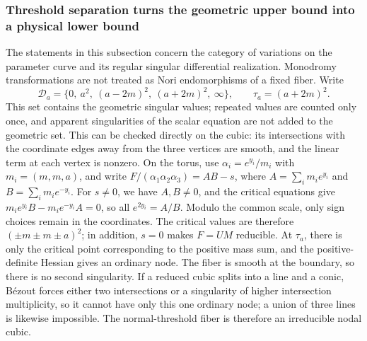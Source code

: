 \documentclass[11pt,a4paper,oneside]{article}
\theoremstyle{plain}
\theoremstyle{definition}
\theoremstyle{remark}
\numberwithin{equation}{section}
\begin{document}
\subsubsection{Threshold separation turns the geometric upper bound into a physical lower bound}
The statements in this subsection concern the category of variations on the parameter curve and its regular singular differential realization.
Monodromy transformations are not treated as Nori endomorphisms of a fixed fiber.
Write
\[
 \mathcal D_a=\{0,\ a^2,\ (a-2m)^2,\ (a+2m)^2,\ \infty\},
 \qquad \tau_a=(a+2m)^2.
\]
This set contains the geometric singular values; repeated values are counted only once,
and apparent singularities of the scalar equation are not added to the geometric set.
This can be checked directly on the cubic: its intersections with the coordinate edges away from the three vertices are smooth,
and the linear term at each vertex is nonzero. On the torus, use $\alpha_i=e^{y_i}/m_i$ with $m_i=(m,m,a)$,
and write $F/(\alpha_1\alpha_2\alpha_3)=AB-s$,
where $A=\sum_i m_i e^{y_i}$ and $B=\sum_i m_i e^{-y_i}$.
For $s\ne0$, we have $A,B\ne0$, and the critical equations give
$m_i e^{y_i}B-m_i e^{-y_i}A=0$,
so all $e^{2y_i}=A/B$. Modulo the common scale, only sign choices remain in the coordinates.
The critical values are therefore $(\pm m\pm m\pm a)^2$; in addition, $s=0$ makes $F=UM$ reducible.
At $\tau_a$, there is only the critical point corresponding to the positive mass sum, and the positive-definite Hessian gives an ordinary node.
The fiber is smooth at the boundary, so there is no second singularity.
If a reduced cubic splits into a line and a conic, Bézout forces either two intersections or a singularity of higher intersection multiplicity,
so it cannot have only this one ordinary node; a union of three lines is likewise impossible.
The normal-threshold fiber is therefore an irreducible nodal cubic.
\end{document}

